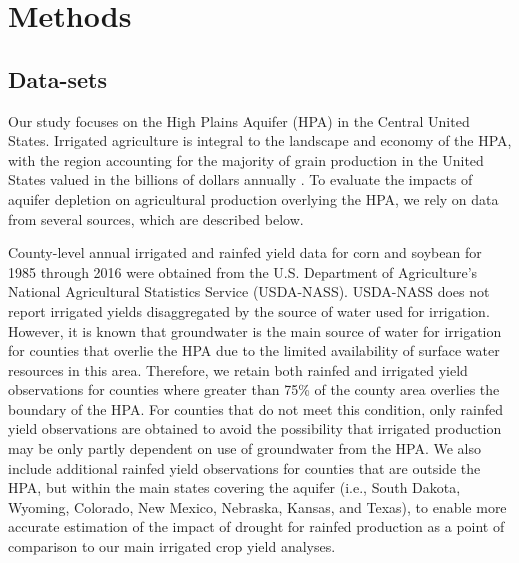 \documentclass[
]{article}
\begin{document}
\hypertarget{methods}{%
\section{Methods}\label{methods}}

\hypertarget{data-sets}{%
\subsection{Data-sets}\label{data-sets}}

Our study focuses on the High Plains Aquifer (HPA) in the Central United States. Irrigated agriculture is integral to the landscape and economy of the HPA, with the region accounting for the majority of grain production in the United States valued in the billions of dollars annually \citep{smidt2016complex,fenichel2016measuring}. To evaluate the impacts of aquifer depletion on agricultural production overlying the HPA, we rely on data from several sources, which are described below.

County-level annual irrigated and rainfed yield data for corn and soybean for 1985 through 2016 were obtained from the U.S. Department of Agriculture's National Agricultural Statistics Service (USDA-NASS). USDA-NASS does not report irrigated yields disaggregated by the source of water used for irrigation. However, it is known that groundwater is the main source of water for irrigation for counties that overlie the HPA due to the limited availability of surface water resources in this area. Therefore, we retain both rainfed and irrigated yield observations for counties where greater than 75\% of the county area overlies the boundary of the HPA. For counties that do not meet this condition, only rainfed yield observations are obtained to avoid the possibility that irrigated production may be only partly dependent on use of groundwater from the HPA. We also include additional rainfed yield observations for counties that are outside the HPA, but within the main states covering the aquifer (i.e., South Dakota, Wyoming, Colorado, New Mexico, Nebraska, Kansas, and Texas), to enable more accurate estimation of the impact of drought for rainfed production as a point of comparison to our main irrigated crop yield analyses.
\end{document}
